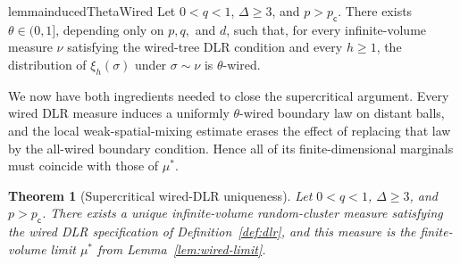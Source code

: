 \documentclass[11pt]{amsart}
\theoremstyle{plain}
\newtheorem{theorem}{Theorem}[section]
\theoremstyle{definition}
\theoremstyle{remark}
\newcommand{\pc}{p_{\mathsf{c}}}
\begin{document}
\begin{restatable}{lemma}{inducedThetaWired}
\label{lem:induced-theta-wired}
Let $0<q<1$, $\Delta\ge3$, and $p>\pc$. There exists $\theta\in(0,1]$, depending only on $p,q,$ and $d$, such that, for every infinite-volume measure $\nu$ satisfying the wired-tree DLR condition and every $h\ge1$, the distribution of $\xi_h(\sigma)$ under $\sigma\sim\nu$ is $\theta$-wired.
\end{restatable}

We now have both ingredients needed to close the supercritical argument. Every wired DLR measure induces a uniformly $\theta$-wired boundary law on distant balls, and the local weak-spatial-mixing estimate erases the effect of replacing that law by the all-wired boundary condition. Hence all of its finite-dimensional marginals must coincide with those of $\mu^*$.

\begin{theorem}[Supercritical wired-DLR uniqueness]
\label{thm:uniqueness}
Let $0<q<1$, $\Delta\ge3$, and $p>\pc$. There exists a unique infinite-volume random-cluster measure satisfying the wired DLR specification of Definition~\ref{def:dlr}, and this measure is the finite-volume limit $\mu^*$ from Lemma~\ref{lem:wired-limit}.
\end{theorem}
\end{document}
